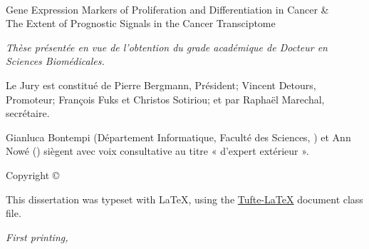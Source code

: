\begin{fullwidth}
~\vfill
\thispagestyle{empty}
\setlength{\parindent}{0pt}
\setlength{\parskip}{\baselineskip}

Gene Expression Markers of Proliferation and Differentiation in Cancer
\&\\
The Extent of Prognostic Signals in the Cancer Transciptome

\emph{Thèse présentée en vue de l’obtention du grade académique de Docteur en
  Sciences Biomédicales.}

Le Jury est constitué de Pierre Bergmann, Président; Vincent Detours, Promoteur;
François Fuks et Christos Sotiriou; et par Raphaël Marechal, secrétaire.

Gianluca Bontempi (Département Informatique, Faculté des Sciences,
) et Ann Nowé () siègent avec voix consultative
au titre « d’expert extérieur ».

Copyright \copyright\ \the\year\ \thanklessauthor{}

This dissertation was typeset with \LaTeX, using the
\href{https://tufte-latex.github.io/tufte-latex/}{\textsf{Tufte-LaTeX}} document
class file.  %

\par{}









\par\textit{First printing, \monthyear}
\end{fullwidth}

